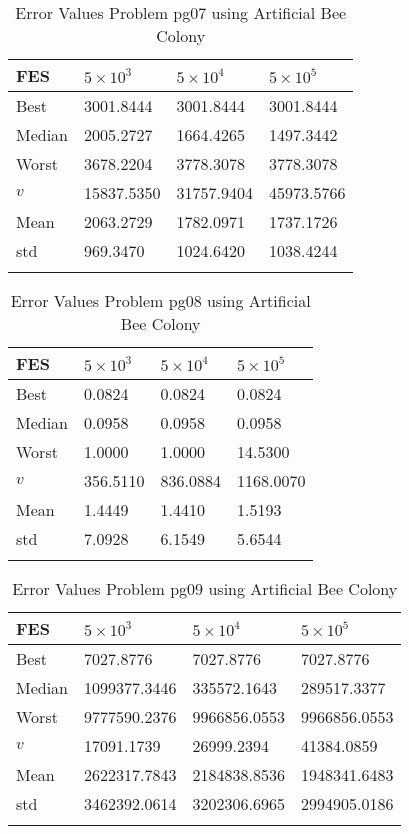 \documentclass[10pt, a4paper]{book}
\begin{document}
\begin{center}
\begin{longtable}{l l l l}
FES & $5 \times 10^{3}$ & $5 \times 10^{4}$ & $5 \times 10^{5}$ \\
\hline
Best & 3001.8444 & 3001.8444 & 3001.8444 \\
Median & 2005.2727 & 1664.4265 & 1497.3442 \\
Worst & 3678.2204 & 3778.3078 & 3778.3078 \\
$v$ & 15837.5350 & 31757.9404 & 45973.5766 \\
Mean & 2063.2729 & 1782.0971 & 1737.1726 \\
std & 969.3470 & 1024.6420 & 1038.4244 \\
\caption{ Error Values Problem pg07 using Artificial Bee Colony }
\end{longtable}
\end{center}

\begin{center}
\begin{longtable}{l l l l}
FES & $5 \times 10^{3}$ & $5 \times 10^{4}$ & $5 \times 10^{5}$ \\
\hline
Best & 0.0824 & 0.0824 & 0.0824 \\
Median & 0.0958 & 0.0958 & 0.0958 \\
Worst & 1.0000 & 1.0000 & 14.5300 \\
$v$ & 356.5110 & 836.0884 & 1168.0070 \\
Mean & 1.4449 & 1.4410 & 1.5193 \\
std & 7.0928 & 6.1549 & 5.6544 \\
\caption{ Error Values Problem pg08 using Artificial Bee Colony }
\end{longtable}
\end{center}

\begin{center}
\begin{longtable}{l l l l}
FES & $5 \times 10^{3}$ & $5 \times 10^{4}$ & $5 \times 10^{5}$ \\
\hline
Best & 7027.8776 & 7027.8776 & 7027.8776 \\
Median & 1099377.3446 & 335572.1643 & 289517.3377 \\
Worst & 9777590.2376 & 9966856.0553 & 9966856.0553 \\
$v$ & 17091.1739 & 26999.2394 & 41384.0859 \\
Mean & 2622317.7843 & 2184838.8536 & 1948341.6483 \\
std & 3462392.0614 & 3202306.6965 & 2994905.0186 \\
\caption{ Error Values Problem pg09 using Artificial Bee Colony }
\end{longtable}
\end{center}
\end{document}
